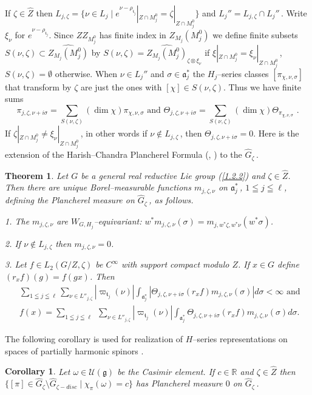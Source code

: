 \documentclass{conm-p-l}
\newtheorem{theorem}[equation]{Theorem}
\newtheorem{corollary}[equation]{Corollary}
\renewcommand{\gg}{\mathfrak{g}}
\def\ga{\mathfrak{a}}
\def\gg{\mathfrak{g}}
\def\gt{\mathfrak{t}}
\def\R{\mathbb{R}}
\def\cU{\mathcal{U}}
\begin{document}
If $\zeta\in\widehat{Z}$ then $L_{j,\zeta} =
\{\nu \in L_j \mid e^{\nu - \rho_{\gt_j}}|_{Z\cap M_j^0} =
\zeta|_{Z\cap M_j^0}\}$ and $L_j'' = L_{j,\zeta}\cap L_j''$\,.
Write $\xi_\nu$ for $e^{\nu - \rho_{\gt_j}}$.  Since $ZZ_{M_j^0}$
has finite index in $Z_{M_j}(M_j^0)$ we define finite subsets 
$S(\nu,\zeta) \subset \widehat{Z_{M_j}(M_j^0)}$ by
$S(\nu,\zeta) = \widehat{Z_{M_j}(M_j^0)}_{\zeta\otimes\xi_\nu}$ if 
$\xi|_{Z\cap M_j^0} = \xi_\nu|_{Z\cap M_j^0}$\,,  
$S(\nu,\zeta) = \emptyset$ otherwise.  When $\nu \in L_j''$ and 
$\sigma \in \ga_j^*$ the $H_j$--series classes $[\pi_{\chi,\nu,\sigma}]$
that transform by $\zeta$ are just the ones with $[\chi] \in S(\nu,\zeta)$. 
Thus we have finite sums
$$
\pi_{j,\zeta,\nu+i\sigma} = {\sum}_{S(\nu,\zeta)} (\dim \chi)
	\pi_{\chi,\nu,\sigma} \text{ and }
\Theta_{j,\zeta,\nu+i\sigma} = {\sum}_{S(\nu,\zeta)} (\dim \chi)
	\Theta_{\pi_{\chi,\nu,\sigma}}\,\,.
$$
If $\zeta|_{Z\cap M_j^0} \ne \xi_\nu|_{Z\cap M_j^0}$\,, in other words if
$\nu \not\in L_{j,\zeta}$\,, then $\Theta_{j,\zeta,\nu+i\sigma} = 0$.
Here is the 
extension \cite{W1973} of the Harish--Chandra Plancherel
Formula (\cite{HC1970}, \cite{HC1971}) to the $\widehat{G}_\zeta$\,.

\begin{theorem}\label{5.1.6}
Let $G$ be a general real reductive Lie group {\rm (\ref{1.2.2})} and 
$\zeta \in \widehat{Z}$.
Then there are unique Borel--measurable functions $m_{j,\zeta,\nu}$ on
$\ga_j^*$\,, $1\leqq j\leqq\ell$, defining the
{\rm Plancherel measure on} $\widehat{G}_\zeta$\,, as follows.

{\rm 1.} The $m_{j,\zeta,\nu}$ are $W_{G,H_j}$--equivariant:
$w^*m_{j,\zeta,\nu}(\sigma) = 
m_{j,w^*\zeta,w^*\nu}(w^*\sigma)$.

{\rm 2.} If $\nu \notin L_{j,\zeta}$ then $m_{j,\zeta,\nu} = 0$. 

{\rm 3.} Let $f \in L_2(G/Z,\zeta)$ be $C^\infty$ with support compact 
modulo $Z$.  If $x \in G$ define $(r_xf)(g) = f(gx)$.  Then
\begin{equation}\label{5.1.7}
\begin{aligned}
&\sum_{1\leqq j\leqq\ell} \sum_{\nu \in L''_{j,\zeta}} |\varpi_{\gt_j}(\nu)|
	\int_{\ga_j^*} |\Theta_{j,\zeta,\nu+i\sigma}(r_xf)
	m_{j,\zeta,\nu}(\sigma)|d\sigma < \infty \text{ and } \\
&f(x) = \sum_{1\leqq j\leqq\ell}\,\, \sum_{\nu \in L''_{j,\zeta}} 
	|\varpi_{\gt_j}(\nu)| \int_{\ga_j^*} 
	\Theta_{j,\zeta,\nu+i\sigma}(r_xf)
	m_{j,\zeta,\nu}(\sigma) d\sigma.
\end{aligned}
\end{equation}
\end{theorem}
The following corollary is used for realization of $H$--series
representations on spaces of partially harmonic spinors \cite{W1974a}.
\begin{corollary}\label{5.7.1}
Let $\omega \in \cU(\gg)$ be the Casimir element.  If $c \in \R$
and $\zeta \in \widehat{Z}$ then $\{[\pi] \in \widehat{G}_\zeta
\setminus \widehat{G}_{\zeta-disc} \mid \chi_\pi(\omega) = c\}$ has 
Plancherel measure $0$ on $\widehat{G}_\zeta$\,.
\end{corollary}
\end{document}
